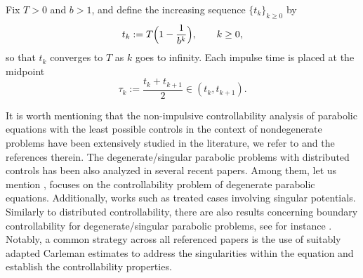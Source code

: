 \documentclass[sn-mathphys]{sn-jnl}
\begin{document}
Fix $T>0$ and $b>1$, and define the increasing sequence $\{t_k\}_{k\ge0}$ by
\begin{equation*}
t_k:=T\Bigl(1-\frac{1}{b^k}\Bigr),\qquad k\ge0,
\end{equation*}
so that $t_k$ converges to $T$ as $k$ goes to infinity. Each impulse time is placed at the midpoint
\begin{equation*}
\tau_k:=\frac{t_k+t_{k+1}}{2}\in(t_k,t_{k+1}).
\end{equation*}

It is worth mentioning that the non-impulsive controllability analysis of parabolic equations with the least possible controls in the context of nondegenerate problems have been extensively studied in the literature, we refer to \citep{ABD2006, ABDG2009, AJMW2024, CGKM2023} and the references therein. The degenerate/singular parabolic problems with distributed controls has been also analyzed in several recent papers. Among them, let us mention \citep{BCG, BAJS, CMV}, focuses on the controllability problem of degenerate parabolic equations. Additionally, works such as \citep{AFS, FS, V} treated cases involving singular potentials. Similarly to distributed controllability, there are also results concerning boundary controllability for degenerate/singular parabolic problems, see for instance \cite{BHV'2022,GL'2024}. Notably, a common strategy across all referenced papers is the use of suitably adapted Carleman estimates to address the singularities within the equation and establish the controllability properties. 
\end{document}
